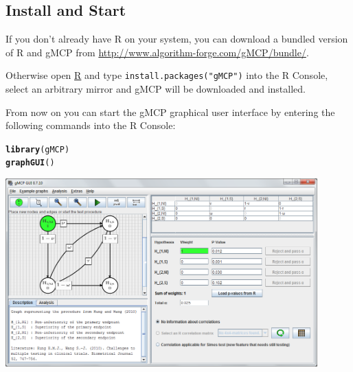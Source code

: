 \documentclass[a4paper, 11pt]{article}\usepackage[]{graphicx}\usepackage[]{color}
\makeatletter
\newcommand{\hlstd}[1]{\textcolor[rgb]{0.345,0.345,0.345}{#1}}%
\newcommand{\hlkwd}[1]{\textcolor[rgb]{0.737,0.353,0.396}{\textbf{#1}}}%
\newenvironment{kframe}{%
 \def\at@end@of@kframe{}%
 \ifinner\ifhmode%
  \def\at@end@of@kframe{\end{minipage}}%
  \begin{minipage}{\columnwidth}%
 \fi\fi%
 \def\FrameCommand##1{\hskip\@totalleftmargin \hskip-\fboxsep
 \colorbox{shadecolor}{##1}\hskip-\fboxsep
     \hskip-\linewidth \hskip-\@totalleftmargin \hskip\columnwidth}%
 \MakeFramed {\advance\hsize-\width
   \@totalleftmargin\z@ \linewidth\hsize
   \@setminipage}}%
 {\par\unskip\endMakeFramed%
 \at@end@of@kframe}
\newenvironment{knitrout}{}{} %
\makeatother
\begin{document}
\subsection*{Install and Start}

If you don't already have R on your system, you can download a bundled
version of R and gMCP from \url{http://www.algorithm-forge.com/gMCP/bundle/}.

\begin{minipage}{0.60\textwidth}

Otherwise open \href{http://cran.r-project.org/bin/windows/base/release.htm}{R}
and type \texttt{install.packages("gMCP")} into the R Console, select an arbitrary mirror and gMCP will be downloaded and installed.

From now on you can start the gMCP graphical user interface by entering the following commands into the R Console:

\begin{knitrout}
\color{fgcolor}\begin{kframe}
\begin{alltt}
\hlkwd{library}\hlstd{(gMCP)}
\hlkwd{graphGUI}\hlstd{()}
\end{alltt}
\end{kframe}
\end{knitrout}


\end{minipage}
\begin{minipage}{0.40\textwidth}
\begin{flushright}
\includegraphics[width=0.9\textwidth]{pictures/FullFeaturedGUI.png}
\end{flushright}
\end{minipage}
\end{document}

